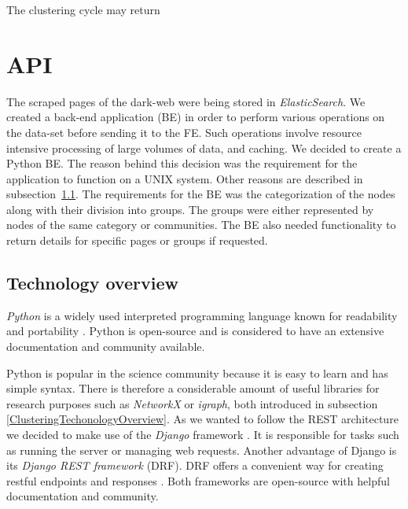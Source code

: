 The clustering cycle may return 

\section{API}\label{APIDevelopment}
The scraped pages of the dark-web were being stored in \textit{ElasticSearch}. We created a back-end application (BE) in order to perform various operations on the data-set before sending it to the FE. Such operations involve resource intensive processing of large volumes of data, and caching. We decided to create a Python BE. The reason behind this decision was the requirement for the application to function on a UNIX system. Other reasons are described in subsection~\ref{technologyOverwiew}. The requirements for the BE was the categorization of the nodes along with their division into groups. The groups were either represented by nodes of the same category or communities. The BE also needed functionality to return details for specific pages or groups if requested.
\subsection{Technology overview}
\label{technologyOverwiew}
\textit{Python} is a widely used interpreted programming language known for readability and portability \cite{aboutPython}. Python is open-source and is considered to have an extensive documentation and community available. 

Python is popular in the science community because it is easy to learn and has simple syntax. There is therefore a considerable amount of useful libraries for research purposes such as \textit{NetworkX} or \textit{igraph}, both introduced in subsection \ref{ClusteringTechonologyOverview}.  
As we wanted to follow the REST architecture we decided to make use of the \textit{Django} framework \cite{meetDjango}. It is responsible for tasks such as running the server or managing web requests. Another advantage of Django is its \textit{Django REST framework} (DRF). DRF offers a convenient way for creating restful endpoints and responses \cite{djangoRest}. Both frameworks are open-source with helpful documentation and community. 

